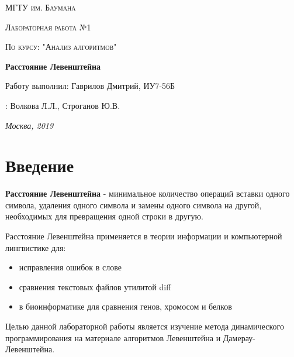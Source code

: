﻿\documentclass[12pt]{report}
\begin{document}
\begin{titlepage}
	\centering
	{\scshape\LARGE МГТУ им. Баумана \par}
	\vspace{3cm}
	{\scshape\Large Лабораторная работа №1\par}
	\vspace{0.5cm}	
	{\scshape\Large По курсу: "Анализ алгоритмов"\par}
	\vspace{1.5cm}
	{\huge\bfseries Расстояние Левенштейна\par}
	\vspace{2cm}
	\Large Работу выполнил: Гаврилов Дмитрий, ИУ7-56Б\par
	\vspace{0.5cm}
	:  Волкова Л.Л., Строганов Ю.В.\par

	\vfill
	\large \textit {Москва, 2019} \par
\end{titlepage}

\tableofcontents

\newpage
\chapter*{Введение}
\textbf{Расстояние Левенштейна} - минимальное количество операций вставки одного символа, удаления одного символа и замены одного символа на другой, необходимых для превращения одной строки в другую.

Расстояние Левенштейна применяется в теории информации и компьютерной лингвистике для:

\begin{itemize}
	\item исправления ошибок в слове
	\item сравнения текстовых файлов утилитой diff
	\item в биоинформатике для сравнения генов, хромосом и белков
\end{itemize}

Целью данной лабораторной работы является изучение метода динамического программирования на материале алгоритмов
Левенштейна и Дамерау-Левенштейна. 
\end{document}
